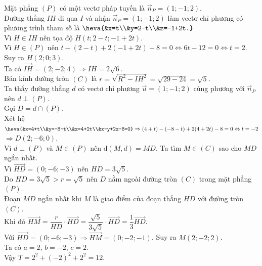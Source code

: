 \begin{ex}
{\begin{itemchoice}
			Mặt phẳng $(P)$ có một vectơ pháp tuyến là $\overrightarrow{n}_P = (1; -1; 2)$.\\
			Đường thẳng $IH$ đi qua $I$ và nhận $\overrightarrow{n}_P = (1; -1; 2)$ làm vectơ chỉ phương có phương trình tham số là $\heva{&x=t\\&y=2-t\\&z=-1+2t.}$\\
			Vì $H\in IH$ nên tọa độ $H(t; 2-t; -1+2t)$.\\
			Vì $H \in (P)$ nên
			$t - (2-t) + 2(-1+2t) - 8 = 0 \Leftrightarrow 6t - 12 = 0 \Leftrightarrow t = 2$.\\
			Suy ra $H(2; 0; 3).$\\
			Ta có $\overrightarrow{IH}=(2;-2;4)\Rightarrow IH=2\sqrt{6}$.\\
			Bán kính đường tròn $(C)$ là $r = \sqrt{R^2 - IH^2} =\sqrt{29 - 24} = \sqrt{5}$.\\
			Ta thấy đường thẳng $d$ có vectơ chỉ phương $\overrightarrow{u} = (1; -1; 2)$ cùng phương với $\overrightarrow{n}_P$ nên $d \perp (P)$.\\
			Gọi $D = d \cap (P)$.\\
			Xét hệ $\heva{&x=4+t\\&y=-8-t\\&z=4+2t\\&x-y+2z-8=0}\Rightarrow (4+t)-(-8-t)+2(4+2t)-8=0\Leftrightarrow t=-2$\\
			$\Rightarrow D(2;-6;0)$.\\
			Vì $d \perp (P)$ và $M \in (P)$ nên $\mathrm{d}(M, d) = MD$. Ta tìm $M \in (C)$ sao cho $MD$ ngắn nhất.\\
			Vì $\overrightarrow{HD}=(0;-6;-3)$ nên $HD=3\sqrt{5}$.\\
			Do $HD = 3\sqrt{5} > r = \sqrt{5}$ nên $D$ nằm ngoài đường tròn $(C)$ trong mặt phẳng $(P)$.\\
			Đoạn $MD$ ngắn nhất khi $M$ là giao điểm của đoạn thẳng $HD$ với đường tròn $(C)$.\\
			Khi đó $\overrightarrow{HM} = \dfrac{r}{HD}\cdot\overrightarrow{HD} = \dfrac{\sqrt{5}}{3\sqrt{5}}\cdot\overrightarrow{HD} = \dfrac{1}{3}\overrightarrow{HD}$.\\
			Với $\overrightarrow{HD} = (0; -6; -3) \Rightarrow \overrightarrow{HM} = (0; -2; -1)$. Suy ra $M(2; -2; 2)$.\\
			Ta có $a=2$, $b=-2$, $c=2$.\\
			Vậy $T = 2^2 + (-2)^2 + 2^2 = 12$.
		\end{itemchoice}
	}
\end{ex}

